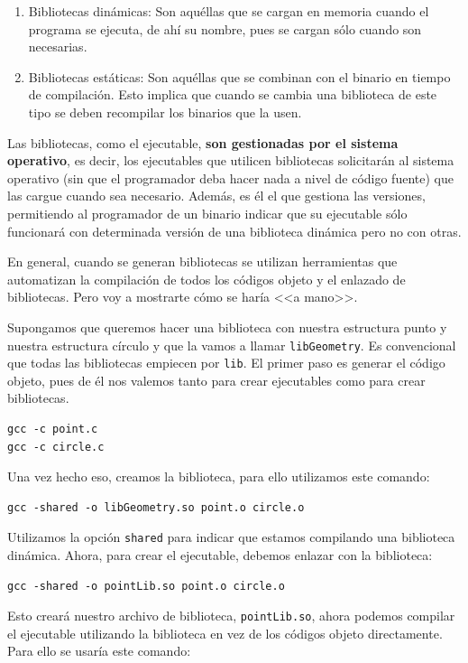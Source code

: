 \documentclass[a4paper]{article}
\begin{document}
\begin{enumerate}
\item Bibliotecas dinámicas: Son aquéllas que se cargan en memoria cuando el
programa se ejecuta, de ahí su nombre, pues se cargan sólo cuando son
necesarias.
\item Bibliotecas estáticas: Son aquéllas que se combinan con el binario en
tiempo de compilación. Esto implica que cuando se cambia una biblioteca de este
tipo se deben recompilar los binarios que la usen.
\end{enumerate}

Las bibliotecas, como el ejecutable, \textbf{son gestionadas por el sistema
operativo}, es decir, los ejecutables que utilicen bibliotecas solicitarán al
sistema operativo (sin que el programador deba hacer nada a nivel de código
fuente) que las cargue cuando sea necesario. Además, es él el que gestiona
las versiones, permitiendo al programador de un binario indicar que su
ejecutable sólo funcionará con determinada versión de una biblioteca dinámica
pero no con otras.

En general, cuando se generan bibliotecas se utilizan herramientas que
automatizan la compilación de todos los códigos objeto y el enlazado de
bibliotecas. Pero voy a mostrarte cómo se haría <<a mano>>.

Supongamos que queremos hacer una biblioteca con nuestra estructura punto y
nuestra estructura círculo y que la vamos a llamar \verb!libGeometry!.
Es convencional que todas las bibliotecas empiecen por \verb!lib!.
El primer paso es generar el código objeto,
pues de él nos valemos tanto para crear ejecutables como para crear bibliotecas.
\begin{verbatim}
gcc -c point.c
gcc -c circle.c
\end{verbatim}

Una vez hecho eso, creamos la biblioteca, para ello utilizamos este comando:
\begin{verbatim}
gcc -shared -o libGeometry.so point.o circle.o
\end{verbatim}

Utilizamos la opción \verb!shared! para indicar que estamos compilando
una biblioteca dinámica. Ahora, para crear el ejecutable, debemos enlazar con
la biblioteca:

\begin{verbatim}
gcc -shared -o pointLib.so point.o circle.o
\end{verbatim}

Esto creará nuestro archivo de biblioteca, \verb!pointLib.so!, ahora podemos
compilar el ejecutable utilizando la biblioteca en vez de los códigos objeto
directamente. Para ello se usaría este comando:
\end{document}
